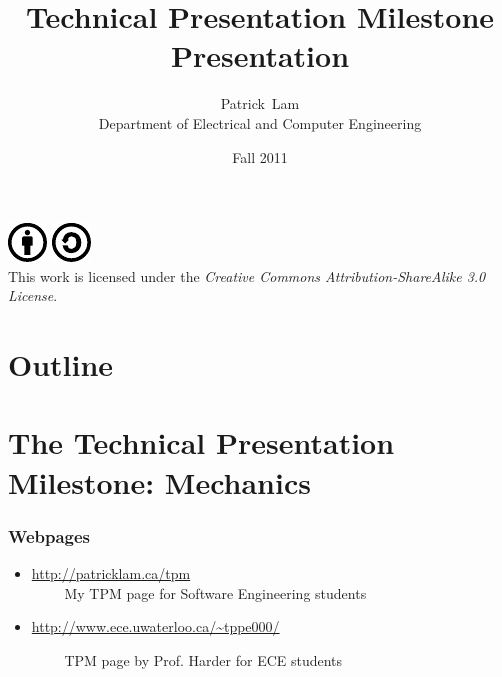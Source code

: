 \documentclass{beamer}
\title{Technical Presentation Milestone Presentation}
\author{Patrick~Lam\\Department of Electrical and Computer Engineering}
\date{Fall 2011}
\begin{document}
\newcommand{\CcNote}[1]{%
	This work is licensed under the \textit{Creative Commons #1 3.0 License}.%
}
\newcommand{\CcImageBy}[1]{%
	\includegraphics[scale=#1]{creative_commons/cc_by_30.pdf}%
}
\newcommand{\CcImageSa}[1]{%
	\includegraphics[scale=#1]{creative_commons/cc_sa_30.pdf}%
}
\newcommand{\CcGroupBySa}[2]{%
	\CcImageBy{#1}\hspace*{#2}\CcImageSa{#1}%
}
\newcommand{\CcLongnameBySa}{Attribution-ShareAlike}

\begin{frame}
  \titlepage

  \vfill
  \begin{center}
    \CcGroupBySa{0.83}{0.95ex}\\
		  {\tiny\CcNote{\CcLongnameBySa}}
		  \vspace*{-2.5ex}
  \end{center}

\end{frame}

\section*{Outline}
\begin{frame}
  \tableofcontents
\end{frame}

\section[TPM]{The Technical Presentation Milestone: Mechanics}

\begin{frame}
\frametitle{Webpages}

\begin{itemize}
\item[] {\large
\url{http://patricklam.ca/tpm}
}\\
$\qquad$ My TPM page for Software Engineering students\\[2em]

\item[] {\large 
\url{http://www.ece.uwaterloo.ca/~tppe000/}
}

$\qquad$ TPM page by Prof. Harder for ECE students
\end{itemize}

\end{frame}
\end{document}
